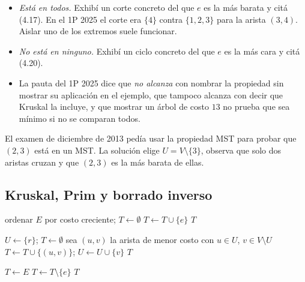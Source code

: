 \begin{receta}
\begin{itemize}
  \item \emph{Está en todos.} Exhibí un corte concreto del que $e$ es la más barata y citá (4.17). En el 1P 2025 el corte era $\{4\}$ contra $\{1,2,3\}$ para la arista $(3,4)$. Aislar uno de los extremos suele funcionar.
  \item \emph{No está en ninguno.} Exhibí un ciclo concreto del que $e$ es la más cara y citá (4.20).
  \item La pauta del 1P 2025 dice que \emph{no alcanza} con nombrar la propiedad sin mostrar su aplicación en el ejemplo, que tampoco alcanza con decir que Kruskal la incluye, y que mostrar un árbol de costo $13$ no prueba que sea mínimo si no se comparan todos.
\end{itemize}
\end{receta}

El examen de diciembre de 2013 pedía usar la propiedad MST para probar que $(2,3)$ está en un MST. La solución elige $U=V\setminus\{3\}$, observa que solo dos aristas cruzan y que $(2,3)$ es la más barata de ellas.

\subsection{Kruskal, Prim y borrado inverso}

\begin{algorithmic}[1]
  \State ordenar $E$ por costo creciente; $T\gets\emptyset$
     \State $T\gets T\cup\{e\}$ \EndIf
  \EndFor
  \State \Return $T$
\EndFunction
\end{algorithmic}

\begin{algorithmic}[1]
  \State $U\gets\{r\}$; $T\gets\emptyset$
    \State sea $(u,v)$ la arista de menor costo con $u\in U$, $v\in V\setminus U$
    \State $T\gets T\cup\{(u,v)\}$; $U\gets U\cup\{v\}$
  \EndWhile
  \State \Return $T$
\EndFunction
\end{algorithmic}

\begin{algorithmic}[1]
  \State $T\gets E$
     \State $T\gets T\setminus\{e\}$ \EndIf
  \EndFor
  \State \Return $T$
\EndFunction
\end{algorithmic}

